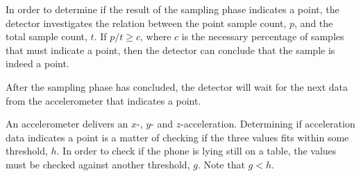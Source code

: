 In order to determine if the result of the sampling phase indicates a point, 
the detector investigates the relation between the point sample count, $p$, 
and the total sample count, $t$. 
If $p/t \geq c$, where $c$ is the necessary percentage of samples that must indicate a point, 
then the detector can conclude that the sample is indeed a point.

After the sampling phase has concluded, 
the detector will wait for the next data from the accelerometer that indicates a point.

An accelerometer delivers an $x$-, $y$- and $z$-acceleration. 
Determining if acceleration data indicates a point is a matter of checking if the three values fits within some threshold, $h$. 
In order to check if the phone is lying still on a table, 
the values must be checked against another threshold, $g$. Note that $g < h$.

